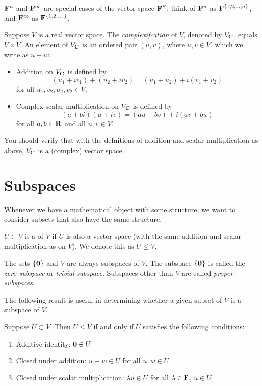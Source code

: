 \begin{remark}
$\mathbf F^n$ and $\mathbf F^\infty$ are special cases of the vector space $\mathbf F^S$; think of $\mathbf F^n$ as $\mathbf F^{\{1,2,\dots,n\}}$, and $\mathbf F^\infty$ as $\mathbf F^{\{1,2,\dots\}}$.
\end{remark}

\begin{example}[Complexification]
Suppose $V$ is a real vector space. The \emph{complexifcation} of $V$, denoted by $V_\mathbf C$, equals $V\times V$. An element of $V_\mathbf C$ is an ordered pair $(u,v)$, where $u,v\in V$, which we write as $u+iv$.
\begin{itemize}
\item Addition on $V_\mathbf C$ is defined by
\[(u_1+iv_1)+(u_2+iv_2)=(u_1+u_2)+i(v_1+v_2)\]
for all $u_1,v_2,u_2,v_2\in V$.
\item Complex scalar multiplication on $V_\mathbf C$ is defined by
\[(a+bi)(u+iv)=(au-bv)+i(av+bu)\]
for all $a,b\in\mathbf R$ and all $u,v\in V$.
\end{itemize}
You should verify that with the defnitions of addition and scalar multiplication as above, $V_\mathbf C$ is a (complex) vector space.
\end{example}
\pagebreak

\section{Subspaces}
Whenever we have a mathematical object with some structure, we want to consider subsets that also have the same structure.

\begin{definition}[Subspace]
$U\subset V$ is a  of $V$ if $U$ is also a vector space (with the same addition and scalar multiplication as on $V$). We denote this as $U\le V$.
\end{definition}

The sets $\{\vb{0}\}$ and $V$ are always subspaces of $V$. The subspace $\{\vb{0}\}$ is called the \emph{zero subspace} or \emph{trivial subspace}. Subspaces other than $V$ are called \emph{proper subspaces}.

The following result is useful in determining whether a given subset of $V$ is a subspace of $V$.

\begin{lemma}\label{lemma:subspace-conditions}
Suppose $U\subset V$. Then $U\le V$ if and only if $U$ satisfies the following conditions:
\begin{enumerate}[label=(\roman*)]
\item Additive identity: $\vb{0}\in U$
\item Closed under addition: $u+w\in U$ for all $u,w\in U$
\item Closed under scalar multiplication: $\lambda u\in U$ for all $\lambda\in\mathbf F$, $u\in U$
\end{enumerate}
\end{lemma}

